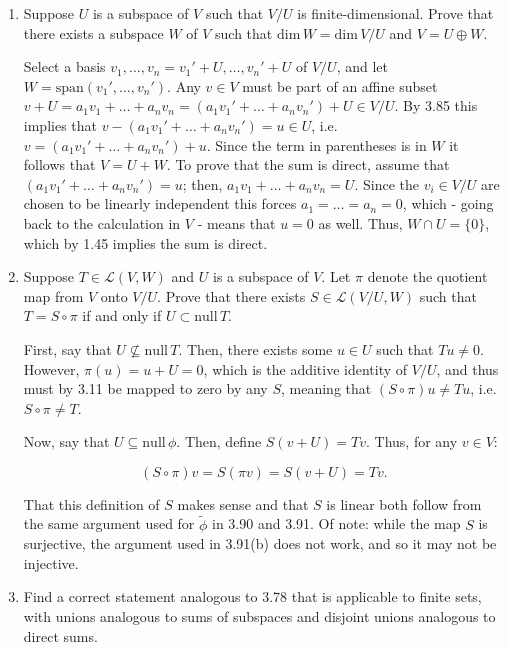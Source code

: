 \documentclass{book}
\begin{document}
\begin{enumerate}
\item Suppose \(U\) is a subspace of \(V\) such that \(V/U\) is finite-dimensional.  Prove that there exists a subspace \(W\) of \(V\) such that \(\textrm{dim} \, W=\textrm{dim} \, V/U\) and \(V=U \oplus W\).

Select a basis \(v_1,\dots,v_n = v_1'+U,\dots,v_n'+U\) of \(V/U\), and let \(W=\text{span}(v_1',\dots,v_n')\).  Any \(v \in V\) must be part of an affine subset \(v+U=a_1v_1+\dots+a_nv_n=(a_1v_1'+\dots+a_nv_n')+U \in V/U\).  By 3.85 this implies that \(v-(a_1v_1'+\dots+a_nv_n')=u \in U\), i.e. \(v=(a_1v_1'+\dots+a_nv_n')+u\).  Since the term in parentheses is in \(W\) it follows that \(V=U+W\).  To prove that the sum is direct, assume that \((a_1v_1'+\dots+a_nv_n') = u\); then, \(a_1v_1+\dots+a_nv_n=U\).  Since the \(v_i \in V/U\) are chosen to be linearly independent this forces \(a_1=\dots=a_n=0\), which - going back to the calculation in \(V\) - means that \(u=0\) as well.  Thus, \(W \cap U=\{0\}\), which by 1.45 implies the sum is direct.

\item Suppose \(T \in \mathcal{L}(V,W)\) and \(U\) is a subspace of \(V\).  Let \(\pi\) denote the quotient map from \(V\) onto \(V/U\).  Prove that there exists \(S \in \mathcal{L}(V/U,W)\) such that \(T=S \circ \pi\) if and only if \(U \subset \textrm{null} \, T\).

First, say that \(U \nsubseteq \text{null} \, T\).  Then, there exists some \(u \in U\) such that \(Tu \neq 0\).  However, \(\pi(u)=u+U=0\), which is the additive identity of \(V/U\), and thus must by 3.11 be mapped to zero by any \(S\), meaning that \((S \circ \pi)u \neq Tu\), i.e. \(S \circ \pi \neq T\).

Now, say that \(U \subseteq \text{null} \, \phi\).  Then, define \(S(v+U)=Tv\).  Thus, for any \(v \in V\):

\begin{equation*}
    (S \circ \pi)v = S(\pi v) = S(v+U) = Tv.
\end{equation*}

That this definition of \(S\) makes sense and that \(S\) is linear both follow from the same argument used for \(\widetilde{\phi}\) in 3.90 and 3.91.  Of note: while the map \(S\) is surjective, the argument used in 3.91(b) does not work, and so it may not be injective. 

\item Find a correct statement analogous to 3.78 that is applicable to finite sets, with unions analogous to sums of subspaces and disjoint unions analogous to direct sums.


\end{enumerate}
\end{document}
